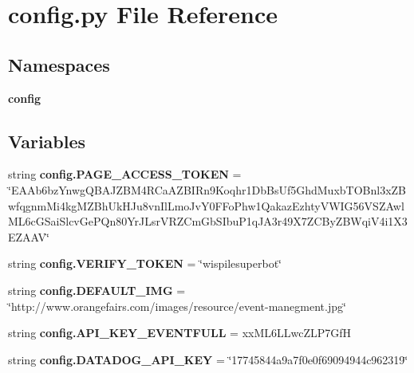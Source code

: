 \section{config.\+py File Reference}
\label{config_8py}
\subsection*{Namespaces}
\begin{DoxyCompactItemize}
\item 
 {\bf config}
\end{DoxyCompactItemize}
\subsection*{Variables}
\begin{DoxyCompactItemize}
\item 
string {\bf config.\+P\+A\+G\+E\+\_\+\+A\+C\+C\+E\+S\+S\+\_\+\+T\+O\+K\+EN} = \char`\"{}E\+A\+Ab6bz\+Ynwg\+Q\+B\+A\+J\+Z\+B\+M4\+R\+Ca\+A\+Z\+B\+I\+Rn9\+Koqhr1\+Db\+Bs\+Uf5\+Ghd\+Muxb\+T\+O\+Bnl3x\+Z\+Bwfqgnm\+Mi4kg\+M\+Z\+Bh\+Uk\+H\+Ju8vn\+Il\+Lmo\+Jv\+Y0\+F\+Fo\+Phw1\+Qakaz\+Ezhty\+V\+W\+I\+G56\+V\+S\+Z\+Awl\+M\+L6c\+G\+Sai\+Slcv\+Ge\+P\+Qn80\+Yr\+J\+Lsr\+V\+R\+Z\+Cm\+Gb\+S\+Ibu\+P1q\+J\+A3r49\+X7\+Z\+C\+By\+Z\+B\+Wqi\+V4i1\+X3\+E\+Z\+A\+AV\char`\"{}
\item 
string {\bf config.\+V\+E\+R\+I\+F\+Y\+\_\+\+T\+O\+K\+EN} = \char`\"{}wispilesuperbot\char`\"{}
\item 
string {\bf config.\+D\+E\+F\+A\+U\+L\+T\+\_\+\+I\+MG} = \char`\"{}http\+://www.\+orangefairs.\+com/images/resource/event-\/manegment.\+jpg\char`\"{}
\item 
string {\bf config.\+A\+P\+I\+\_\+\+K\+E\+Y\+\_\+\+E\+V\+E\+N\+T\+F\+U\+LL} = \textquotesingle{}xx\+M\+L6\+L\+Lwc\+Z\+L\+P7\+GfH\textquotesingle{}
\item 
string {\bf config.\+D\+A\+T\+A\+D\+O\+G\+\_\+\+A\+P\+I\+\_\+\+K\+EY} = \char`\"{}17745844a9a7f0e0f69094944c962319\char`\"{}
\end{DoxyCompactItemize}
